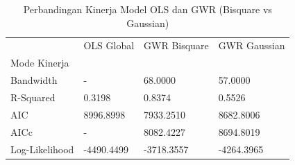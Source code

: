 \begin{table}[H]
\centering
\caption{Perbandingan Kinerja Model OLS dan GWR (Bisquare vs Gaussian)}
\label{tab:model_comparison}
\footnotesize
\begin{tabular}{llll}
\toprule
 & OLS Global & GWR Bisquare & GWR Gaussian \\
Mode Kinerja &  &  &  \\
\midrule
Bandwidth & - & 68.0000 & 57.0000 \\
R-Squared & 0.3198 & 0.8374 & 0.5526 \\
AIC & 8996.8998 & 7933.2510 & 8682.8006 \\
AICc & - & 8082.4227 & 8694.8019 \\
Log-Likelihood & -4490.4499 & -3718.3557 & -4264.3965 \\
\bottomrule
\end{tabular}
\end{table}
